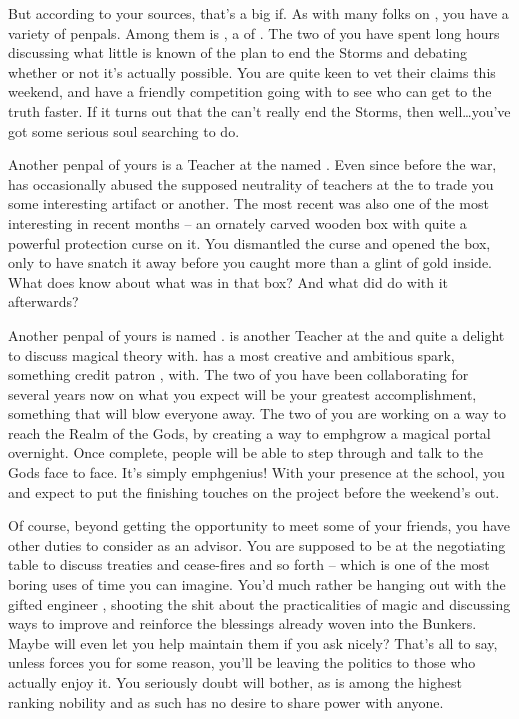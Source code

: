 \documentclass[char]{GL2020}
\begin{document}
But according to your sources, that’s a big if. As with many folks on \pEarth{}, you have a variety of penpals. Among them is \cHedonist{}, a \cHedonist{\cleric} of \cFarmGod{}. The two of you have spent long hours discussing what little is known of the \pTech{} plan to end the Storms and debating whether or not it’s actually possible. You are quite keen to vet their claims this weekend, and have a friendly competition going with \cHedonist{} to see who can get to the truth faster. If it turns out that the \pTech{} can’t really end the Storms, then well\ldots you’ve got some serious soul searching to do.

Another penpal of yours is a Teacher at the \pSc{} named \cChupSecond{}. Even since before the war, \cChupSecond{} has occasionally abused the supposed neutrality of teachers at the \pSc{} to trade you some interesting artifact \cChupSecond{\they} \cChupSecond{\have} or another. The most recent was also one of the most interesting in recent months -- an ornately carved wooden box with quite a powerful protection curse on it. You dismantled the curse and opened the box, only to have \cChupSecond{} snatch it away before you caught more than a glint of gold inside. What does \cChupSecond{} know about what was in that box? And what did \cChupSecond{\they} do with it afterwards?

Another penpal of yours is named \cFlowPriest{}. \cFlowPriest{} is another Teacher at the \pSchool{} and quite a delight to discuss magical theory with. \cFlowPriest{} has a most creative and ambitious spark, something \cFlowPriest{\they} credit  patron \cFlow{\God}, \cFlow{\full} with. The two of you have been collaborating for several years now on what you expect will be your greatest accomplishment, something that will blow everyone away. The two of you are working on a way to reach the Realm of the Gods, by creating a way to emph{grow} a magical portal overnight. Once complete, people will be able to step through and talk to the Gods face to face. It’s simply emph{genius}! With your presence at the school, you and \cFlowPriest{} expect to put the finishing touches on the project before the weekend’s out.

Of course, beyond getting the opportunity to meet some of your friends, you have other duties to consider as an advisor. You are supposed to be at the negotiating table to discuss treaties and cease-fires and so forth -- which is one of the most boring uses of time you can imagine. You’d much rather be hanging out with the gifted engineer \cBunker{}, shooting the shit about the practicalities of magic and discussing ways to improve and reinforce the blessings already woven into the Bunkers. Maybe \cBunker{\they} will even let you help maintain them if you ask nicely? That’s all to say, unless \cEvil{} forces you for some reason, you’ll be leaving the politics to those who actually enjoy it. You seriously doubt \cEvil{\they} will bother, as \cEvil{} is among the highest ranking nobility and as such has no desire to share power with anyone.
\end{document}
